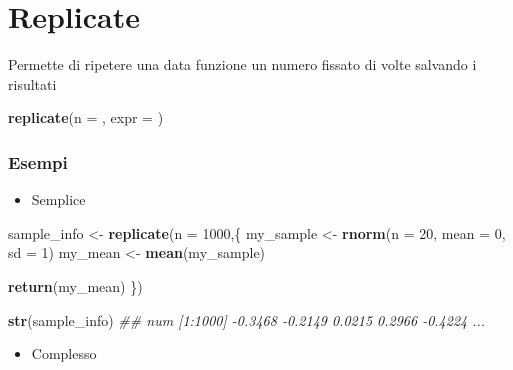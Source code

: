 \documentclass[
]{book}
\newenvironment{Shaded}{\begin{snugshade}}{\end{snugshade}}
\newcommand{\CommentTok}[1]{\textcolor[rgb]{0.56,0.35,0.01}{\textit{#1}}}
\newcommand{\DataTypeTok}[1]{\textcolor[rgb]{0.13,0.29,0.53}{#1}}
\newcommand{\DecValTok}[1]{\textcolor[rgb]{0.00,0.00,0.81}{#1}}
\newcommand{\KeywordTok}[1]{\textcolor[rgb]{0.13,0.29,0.53}{\textbf{#1}}}
\newcommand{\NormalTok}[1]{#1}
\newcommand{\StringTok}[1]{\textcolor[rgb]{0.31,0.60,0.02}{#1}}
\providecommand{\tightlist}{%
  \setlength{\itemsep}{0pt}\setlength{\parskip}{0pt}}
\begin{document}
\hypertarget{replicate}{%
\section{Replicate}\label{replicate}}

Permette di ripetere una data funzione un numero fissato di volte salvando i risultati

\begin{Shaded}
\begin{Highlighting}[]
\KeywordTok{replicate}\NormalTok{(}\DataTypeTok{n =}\NormalTok{ , }\DataTypeTok{expr =}\NormalTok{ )}
\end{Highlighting}
\end{Shaded}

\hypertarget{esempi-5}{%
\subsubsection*{Esempi}\label{esempi-5}}

\begin{itemize}
\tightlist
\item
  Semplice
\end{itemize}

\begin{Shaded}
\begin{Highlighting}[]
\NormalTok{sample_info <-}\StringTok{ }\KeywordTok{replicate}\NormalTok{(}\DataTypeTok{n =} \DecValTok{1000}\NormalTok{,\{}
\NormalTok{  my_sample <-}\StringTok{ }\KeywordTok{rnorm}\NormalTok{(}\DataTypeTok{n =} \DecValTok{20}\NormalTok{, }\DataTypeTok{mean =} \DecValTok{0}\NormalTok{, }\DataTypeTok{sd =} \DecValTok{1}\NormalTok{)}
\NormalTok{  my_mean <-}\StringTok{ }\KeywordTok{mean}\NormalTok{(my_sample)}
  
  \KeywordTok{return}\NormalTok{(my_mean)}
\NormalTok{\})}

\KeywordTok{str}\NormalTok{(sample_info)}
\CommentTok{##  num [1:1000] -0.3468 -0.2149 0.0215 0.2966 -0.4224 ...}
\end{Highlighting}
\end{Shaded}

\begin{itemize}
\tightlist
\item
  Complesso
\end{itemize}
\end{document}
